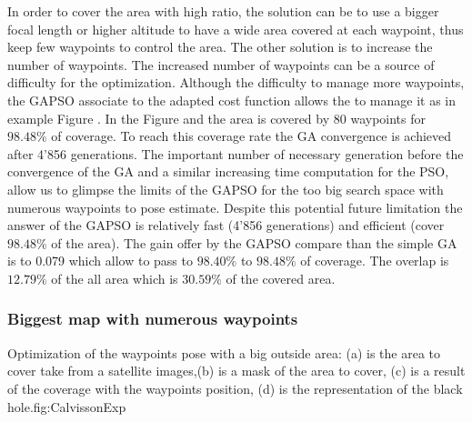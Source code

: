 In order to cover the area with high ratio, the solution can be to use a bigger focal length or higher altitude to have a wide area covered at each waypoint, thus keep few waypoints to control the area. The other solution is to increase the number of waypoints. The increased number of waypoints can be a source of difficulty for the optimization. Although the difficulty to manage more waypoints,  the GAPSO associate to the adapted cost function allows the to manage it as in example Figure . 
 In the Figure  and  the area is covered by 80 waypoints for $98.48\%$ of coverage. To reach this coverage rate the GA convergence is achieved after 4'856 generations. The important number of necessary generation before the convergence of the GA and a similar  increasing time computation for the PSO, allow us to glimpse the limits of the GAPSO for the too big search space with numerous waypoints to pose estimate. Despite this potential future limitation the answer of the GAPSO is relatively fast (4'856 generations) and efficient (cover $98.48\%$ of the area). The gain offer by the GAPSO  compare than  the simple GA is to 0.079 which allow to pass  to $98.40\%$ to $98.48\%$ of coverage.  The overlap is $12.79\%$ of the all area which is  $30.59\%$ of the covered area. 
 

		\subsubsection{Biggest map with numerous waypoints}\label{sec:biggestMapcalWaypoint}
\begin{mfigures}[!]{Optimization of the waypoints pose with a big outside area: (a) is the area to cover take from a satellite images,(b) is a mask of the area to cover, (c) is a result of the coverage with the waypoints position, (d) is the representation of the black hole.}{fig:CalvissonExp} \centering
{}
\hspace{1cm}
\hspace{1cm}
\tabsimuposeCalvisson
\end{mfigures}	

